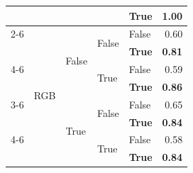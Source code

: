\documentclass{article}
\begin{document}
\begin{table}
\begin{center}
{\begin{tabular}{@{}lllllr@{}}
                                                        &                                   &                           &                           & \textbf{True}         & \textbf{1.00} \\
    \cmidrule{2-6}
                                                        & \multirow[c]{9}{*}{RGB}           & \multirow[c]{4}{*}{False} & \multirow[c]{2}{*}{False} & False                 & 0.60 \\
                                                        &                                   &                           &                           & \textbf{True}         & \textbf{0.81} \\
    \cmidrule{4-6}
                                                        &                                   &                           & \multirow[c]{2}{*}{True}  & False                 & 0.59 \\
                                                        &                                   &                           &                           & \textbf{True}         & \textbf{0.86} \\
    \cmidrule{3-6}
                                                        &                                   & \multirow[c]{4}{*}{True}  & \multirow[c]{2}{*}{False} & False                 & 0.65 \\
                                                        &                                   &                           &                           & \textbf{True}         & \textbf{0.84} \\
    \cmidrule{4-6}
                                                        &                                   &                           & \multirow[c]{2}{*}{True}  & False                 & 0.58 \\
                                                        &                                   &                           &                           & \textbf{True}         & \textbf{0.84} \\
    \bottomrule
\end{tabular}
}
    \end{center}
    \label{tab:past-actions-ablation-o1}
\end{table}
\end{document}
